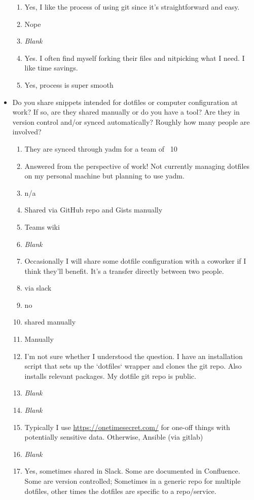 \documentclass[letterpaper]{jdf}
\begin{document}
\begin{itemize}
\begin{enumerate}
        \item Yes, I like the process of using git since it's straightforward and easy.
        \item Nope
        \item \emph{Blank}
        \item Yes. I often find myself forking their files and nitpicking what I need. I like time savings.
        \item Yes, process is super smooth
    \end{enumerate}
    \item Do you share snippets intended for dotfiles or computer configuration at work? If so, are they shared manually or do you have a tool? Are they in version control and/or synced automatically? Roughly how many people are involved?
    \begin{enumerate}
        \item They are synced through yadm for a team of ~10
        \item Answered from the perspective of work! Not currently managing dotfiles on my personal machine but planning to use yadm.
        \item n/a
        \item Shared via GitHub repo and Gists manually
        \item Teams wiki
        \item \emph{Blank}
        \item Occasionally I will share some dotfile configuration with a coworker if I think they'll benefit. It's a transfer directly between two people.
        \item via slack
        \item no
        \item shared manually
        \item Manually
        \item I'm not sure whether I understood the question. I have an installation script that sets up the `dotfiles` wrapper and clones the git repo. Also installs relevant packages. My dotfile git repo is public.
        \item \emph{Blank}
        \item \emph{Blank}
        \item Typically I use \href{https://onetimesecret.com/}{https://onetimesecret.com/} for one-off things with potentially sensitive data. Otherwise, Ansible (via gitlab)
        \item \emph{Blank}
        \item Yes, sometimes shared in Slack. Some are documented in Confluence. Some are version controlled; Sometimes in a generic repo for multiple dotfiles, other times the dotfiles are specific to a repo/service.

\end{enumerate}
\end{itemize}
\end{document}
